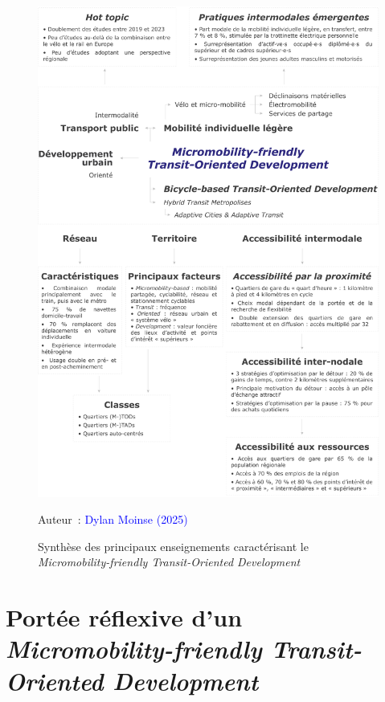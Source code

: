 \begin{refsegment}
    \begin{figure}[h!]\vspace*{4pt}
        \caption{Synthèse des principaux enseignements caractérisant le \textsl{Micromobility-friendly Transit-Oriented Development}}
        \label{fig-conclusion:synthese-enseignements}
        \centerline{\includegraphics[width=1\columnwidth]{src/Figures/Conclusion/FR_Conclusion_generale.pdf}}
        \vspace{5pt}
        \begin{flushright}\scriptsize{
        Auteur~: \textcolor{blue}{Dylan Moinse (2025)}
        }\end{flushright}
    \end{figure}

\section*{Portée réflexive d'un \textsl{Micromobility-friendly Transit-Oriented Development}
    \label{conclusion-generale:portee-reflexive-mtod}
    }


\end{refsegment}
